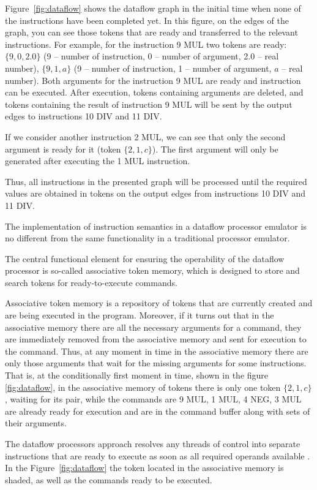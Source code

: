 \documentclass[
11pt,%
tightenlines,%
twoside,%
onecolumn,%
nofloats,%
nobibnotes,%
nofootinbib,%
superscriptaddress,%
noshowpacs,%
centertags]%
{revtex4}
\begin{document}
Figure~\ref{fig:dataflow} shows the dataflow graph in the initial time when none of the instructions have been completed yet.
In this figure, on the edges of the graph, you can see those tokens that are ready and transferred to the relevant instructions.
For example, for the instruction 9 MUL two tokens are ready: $\{9, 0, 2.0\}$ (9 -- number of instruction, 0 -- number of argument, 2.0 -- real number), $\{9, 1, a\}$ (9 -- number of instruction, 1 -- number of argument, $a$ -- real number).
Both arguments for the instruction 9 MUL are ready and instruction can be executed.
After execution, tokens containing arguments are deleted, and tokens containing the result of instruction 9 MUL will be sent by the output edges to instructions 10 DIV and 11 DIV.

If we consider another instruction 2 MUL, we can see that only the second argument is ready for it (token $\{2, 1, c\}$).
The first argument will only be generated after executing the 1 MUL instruction.

Thus, all instructions in the presented graph will be processed until the required values are obtained in tokens on the output edges from instructions 10 DIV and 11 DIV.

The implementation of instruction semantics in a dataflow processor emulator is no different from the same functionality in a traditional processor emulator.

The central functional element for ensuring the operability of the dataflow processor is so-called associative token memory, which is designed to store and search tokens for ready-to-execute commands.

Associative token memory is a repository of tokens that are currently created and are being executed in the program.
Moreover, if it turns out that in the associative memory there are all the necessary arguments for a command, they are immediately removed from the associative memory and sent for execution to the command.
Thus, at any moment in time in the associative memory there are only those arguments that wait for the missing arguments for some instructions.
That is, at the conditionally first moment in time, shown in the figure~ \ref{fig:dataflow}, in the associative memory of tokens there is only one token $\{2, 1, c\}$, waiting for its pair, while the commands are 9 MUL, 1 MUL, 4 NEG, 3 MUL are already ready for execution and are in the command buffer along with sets of their arguments.

The dataflow processors approach resolves any threads of control into separate instructions that are ready to execute as soon as all required operands available \cite{silc}. 
In the Figure~\ref{fig:dataflow} the token located in the associative memory is shaded, as well as the commands ready to be executed.
\end{document}
